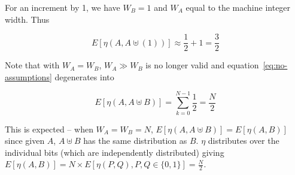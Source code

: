 For an increment by 1, we have $W_B = 1$ and $W_A$ equal to the
machine integer width.  Thus

\begin{equation}
  \label{eq:average-flips}
  E[\eta(A, A \uplus (1))] \approx \frac{1}{2} + 1 = \frac{3}{2}
\end{equation}

Note that with $W_A = W_B$, $W_A \gg W_B$ is no longer valid and
equation~\ref{eq:no-assumptions} degenerates into

\begin{equation}
  E[\eta(A, A \uplus B)] = \displaystyle\sum\limits_{k=0}^{N - 1} \frac{1}{2} =
  \frac{N}{2}
\end{equation}

This is expected -- when $W_A = W_B = N$, $E[\eta(A, A \uplus B)] =
E[\eta(A, B)]$ since given $A$, $A \uplus B$ has the same distribution as
$B$.  $\eta$ distributes over the individual bits (which are
independently distributed) giving $E[\eta(A, B)] = N \times E[\eta(P,
  Q), P, Q \in \{0, 1\}] = \frac{N}{2}$.
 
